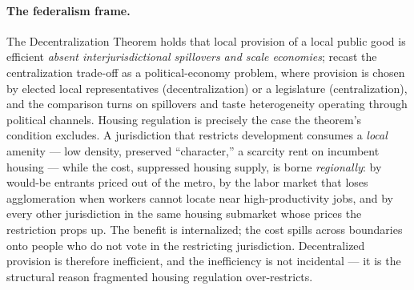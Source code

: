 \documentclass[11pt]{article}
\begin{document}
\paragraph{The federalism frame.} The Decentralization Theorem \citep{oates1972fiscal} holds
that local provision of a local public good is efficient \emph{absent interjurisdictional
spillovers and scale economies}; \citet{besley2003centralized} recast the centralization
trade-off as a political-economy problem, where provision is chosen by elected local
representatives (decentralization) or a legislature (centralization), and the comparison turns
on spillovers and taste heterogeneity operating through political channels. Housing regulation
is precisely the case the theorem's condition excludes. A jurisdiction that restricts
development consumes a \emph{local} amenity --- low density, preserved ``character,'' a
scarcity rent on incumbent housing --- while the cost, suppressed housing supply, is borne
\emph{regionally}: by would-be entrants priced out of the metro, by the labor market that loses
agglomeration when workers cannot locate near high-productivity jobs, and by every other
jurisdiction in the same housing submarket whose prices the restriction props up. The benefit
is internalized; the cost spills across boundaries onto people who do not vote in the
restricting jurisdiction. Decentralized provision is therefore inefficient, and the inefficiency
is not incidental --- it is the structural reason fragmented housing regulation over-restricts.
\end{document}
